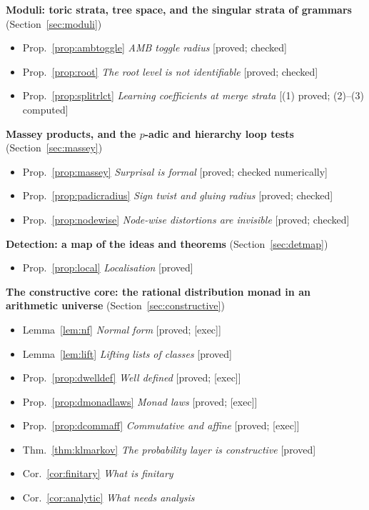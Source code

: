 \documentclass[11pt]{article}
\theoremstyle{definition}
\theoremstyle{remark}
\begin{document}
\noindent\textbf{Moduli: toric strata, tree space, and the singular strata of grammars} (Section~\ref{sec:moduli})
\begin{itemize}[itemsep=0pt]
  \item Prop.~\ref{prop:ambtoggle} \emph{AMB toggle radius} [proved; checked]
  \item Prop.~\ref{prop:root} \emph{The root level is not identifiable} [proved; checked]
  \item Prop.~\ref{prop:splitrlct} \emph{Learning coefficients at merge strata} [(1) proved; (2)--(3) computed]
\end{itemize}
\noindent\textbf{Massey products, and the $p$-adic and hierarchy loop tests} (Section~\ref{sec:massey})
\begin{itemize}[itemsep=0pt]
  \item Prop.~\ref{prop:massey} \emph{Surprisal is formal} [proved; checked numerically]
  \item Prop.~\ref{prop:padicradius} \emph{Sign twist and gluing radius} [proved; checked]
  \item Prop.~\ref{prop:nodewise} \emph{Node-wise distortions are invisible} [proved; checked]
\end{itemize}
\noindent\textbf{Detection: a map of the ideas and theorems} (Section~\ref{sec:detmap})
\begin{itemize}[itemsep=0pt]
  \item Prop.~\ref{prop:local} \emph{Localisation} [proved]
\end{itemize}
\noindent\textbf{The constructive core: the rational distribution monad in an arithmetic universe} (Section~\ref{sec:constructive})
\begin{itemize}[itemsep=0pt]
  \item Lemma~\ref{lem:nf} \emph{Normal form} [proved; [exec]]
  \item Lemma~\ref{lem:lift} \emph{Lifting lists of classes} [proved]
  \item Prop.~\ref{prop:dwelldef} \emph{Well defined} [proved; [exec]]
  \item Prop.~\ref{prop:dmonadlaws} \emph{Monad laws} [proved; [exec]]
  \item Prop.~\ref{prop:dcommaff} \emph{Commutative and affine} [proved; [exec]]
  \item Thm.~\ref{thm:klmarkov} \emph{The probability layer is constructive} [proved]
  \item Cor.~\ref{cor:finitary} \emph{What is finitary}
  \item Cor.~\ref{cor:analytic} \emph{What needs analysis}
\end{itemize}
\end{document}
